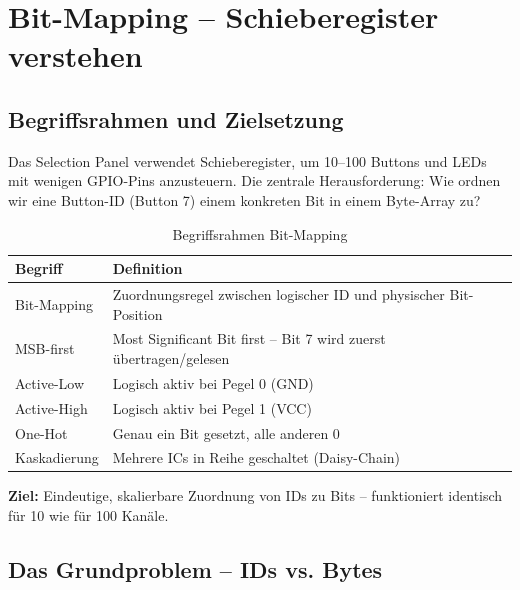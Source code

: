 
\section{Bit-Mapping – Schieberegister verstehen}

\subsection{Begriffsrahmen und Zielsetzung}

Das Selection Panel verwendet Schieberegister, um 10–100 Buttons und LEDs mit wenigen GPIO-Pins anzusteuern. Die zentrale Herausforderung: Wie ordnen wir eine Button-ID (\zB \glqq Button 7\grqq) einem konkreten Bit in einem Byte-Array zu?

\begin{table}[htbp]
\centering
\begin{tabular}{@{}ll@{}}
\toprule
\textbf{Begriff} & \textbf{Definition} \\
\midrule
Bit-Mapping  & Zuordnungsregel zwischen logischer ID und physischer Bit-Position \\
MSB-first    & Most Significant Bit first – Bit 7 wird zuerst übertragen/gelesen \\
Active-Low   & Logisch aktiv bei Pegel 0 (GND) \\
Active-High  & Logisch aktiv bei Pegel 1 (VCC) \\
One-Hot      & Genau ein Bit gesetzt, alle anderen 0 \\
Kaskadierung & Mehrere ICs in Reihe geschaltet (Daisy-Chain) \\
\bottomrule
\end{tabular}
\caption{Begriffsrahmen Bit-Mapping}
\label{tab:bitmapping-begriffe}
\end{table}

\textbf{Ziel:} Eindeutige, skalierbare Zuordnung von IDs zu Bits – funktioniert identisch für 10 wie für 100 Kanäle.

\subsection{Das Grundproblem – IDs vs. Bytes}

